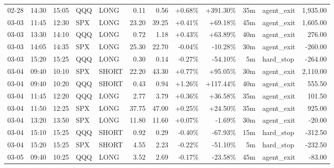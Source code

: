 \documentclass[11pt,a4paper,twoside]{article}
\begin{document}
\begin{center}
\begin{longtable}{>{\color{txtmain}}l l l l l r r r r r >{\color{txtmain}}l r}
02-28 & 14:30 & 15:05 & QQQ & LONG & 0.11 & 0.56 & \textcolor{wingreen}{+0.68\%} & \textcolor{wingreen}{+391.30\%} & 35m & agent\_exit & \textcolor{wingreen}{1,935.00} \\
03-03 & 11:45 & 12:30 & SPX & LONG & 23.20 & 39.25 & \textcolor{wingreen}{+0.41\%} & \textcolor{wingreen}{+69.18\%} & 45m & agent\_exit & \textcolor{wingreen}{1,605.00} \\
03-03 & 13:30 & 14:10 & QQQ & LONG & 0.72 & 1.18 & \textcolor{wingreen}{+0.43\%} & \textcolor{wingreen}{+63.89\%} & 40m & agent\_exit & \textcolor{wingreen}{276.00} \\
03-03 & 14:05 & 14:35 & SPX & LONG & 25.30 & 22.70 & \textcolor{lossred}{-0.04\%} & \textcolor{lossred}{-10.28\%} & 30m & agent\_exit & \textcolor{lossred}{-260.00} \\
03-03 & 15:20 & 15:25 & QQQ & LONG & 0.30 & 0.14 & \textcolor{lossred}{-0.27\%} & \textcolor{lossred}{-54.10\%} & 5m & hard\_stop & \textcolor{lossred}{-264.00} \\
03-04 & 09:40 & 10:10 & SPX & SHORT & 22.20 & 43.30 & \textcolor{wingreen}{+0.77\%} & \textcolor{wingreen}{+95.05\%} & 30m & agent\_exit & \textcolor{wingreen}{2,110.00} \\
03-04 & 09:40 & 10:20 & QQQ & SHORT & 0.43 & 0.94 & \textcolor{wingreen}{+1.26\%} & \textcolor{wingreen}{+117.44\%} & 40m & agent\_exit & \textcolor{wingreen}{555.50} \\
03-04 & 11:45 & 12:20 & QQQ & LONG & 2.77 & 3.79 & \textcolor{wingreen}{+0.36\%} & \textcolor{wingreen}{+36.58\%} & 35m & agent\_exit & \textcolor{wingreen}{101.50} \\
03-04 & 11:50 & 12:25 & SPX & LONG & 37.75 & 47.00 & \textcolor{wingreen}{+0.25\%} & \textcolor{wingreen}{+24.50\%} & 35m & agent\_exit & \textcolor{wingreen}{925.00} \\
03-04 & 13:20 & 13:50 & SPX & LONG & 11.80 & 11.60 & \textcolor{wingreen}{+0.07\%} & \textcolor{lossred}{-1.69\%} & 30m & agent\_exit & \textcolor{lossred}{-20.00} \\
03-04 & 15:10 & 15:25 & QQQ & SHORT & 0.92 & 0.29 & \textcolor{lossred}{-0.40\%} & \textcolor{lossred}{-67.93\%} & 15m & hard\_stop & \textcolor{lossred}{-312.50} \\
03-04 & 15:20 & 15:25 & SPX & SHORT & 4.55 & 2.23 & \textcolor{lossred}{-0.22\%} & \textcolor{lossred}{-51.10\%} & 5m & hard\_stop & \textcolor{lossred}{-232.50} \\
03-05 & 09:40 & 10:25 & QQQ & LONG & 3.52 & 2.69 & \textcolor{lossred}{-0.17\%} & \textcolor{lossred}{-23.58\%} & 45m & agent\_exit & \textcolor{lossred}{-83.00} \\

\end{longtable}
\end{center}
\end{document}

